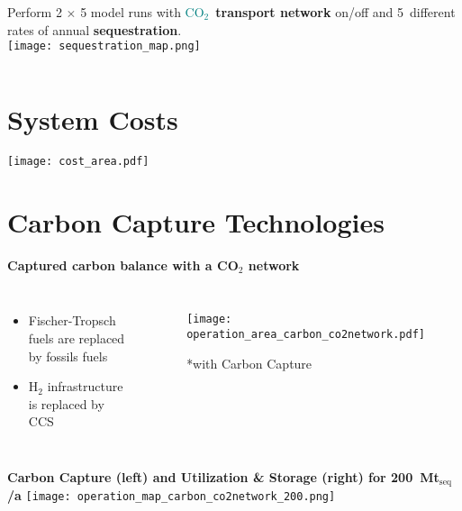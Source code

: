 \documentclass[12pt, aspectratio=169]{beamer}
\newcommand{\carbon}{\textcolor{teal}{CO$_2$}}
\newcommand{\hydrogen}{H$_2$}
\begin{document}
\begin{frame}[plain]
    \begin{columns}
        Perform 2 $\times$ 5 model runs with
        \carbon{}~\textbf{transport network} on/off and 5~different rates of annual \textbf{sequestration}.\\
        \texttt{[image: sequestration\_map.png]}
    \end{columns}
\end{frame}


\section*{System Costs}
\begin{frame}[plain]
    \texttt{[image: cost\_area.pdf]}
\end{frame}


\section*{Carbon Capture Technologies}
\begin{frame}
    \qquad \textbf{Captured carbon balance with a CO$_2$ network}
    \begin{columns}
        \begin{itemize}
            \item  Fischer-Tropsch fuels are replaced by fossils fuels
            \item \hydrogen{} infrastructure is replaced by CCS
        \end{itemize}
        \begin{figure}
            \texttt{[image: operation\_area\_carbon\_co2network.pdf]}
            \par\footnotesize{*with Carbon Capture}
        \end{figure}
    \end{columns}
\end{frame}


\begin{frame}
    \textbf{Carbon Capture (left) and Utilization \& Storage (right) for 200~Mt$_{\text{seq}}$/a}
    \texttt{[image: operation\_map\_carbon\_co2network\_200.png]}
\end{frame}
\end{document}
